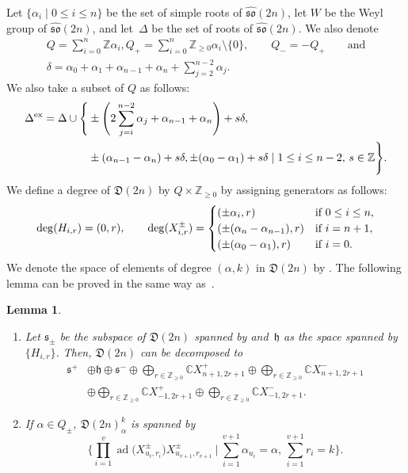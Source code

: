 \documentclass[pdftex]{sigma}
\numberwithin{equation}{section}
\newtheorem{Lemma}[Theorem]{Lemma}
\theoremstyle{definition}
\DeclareMathOperator{\ad}{ad}
\begin{document}
Let $\{\alpha_i\mid0\leq i\leq n\}$ be the set of simple roots of $\widehat{\mathfrak{so}}(2n)$, let $W$ be the Weyl group of $\widehat{\mathfrak{so}}(2n)$, and let~$\Delta$ be the set of roots of $\widehat{\mathfrak{so}}(2n)$. We also denote
\begin{gather*}
Q=\sum_{i=0}^n \mathbb{Z}\alpha_i,Q_+=\sum_{i=0}^n \mathbb{Z}_{\geq0}\alpha_i\setminus\{0\},\qquad Q_-=-Q_+\qquad \text{and}\\ \delta=\alpha_0+\alpha_1+\alpha_{n-1}+\alpha_n+\sum_{j=2}^{n-2} \alpha_j.
\end{gather*} We also take a subset of $Q$ as follows:
\begin{align*}
\Delta^{{\rm ex}}=\Delta\cup\Biggl\{&\pm\Bigg(2\sum_{j=i}^{n-2}\alpha_j+\alpha_{n-1}+\alpha_n\Biggr)+s\delta,\\
&\pm(\alpha_{n-1}-\alpha_n)+s\delta,\pm(\alpha_0-\alpha_1)+s\delta\mid 1\leq i\leq n-2,\,s\in\mathbb{Z}\Biggr\}.
\end{align*}
We define a degree of $\mathfrak{D}(2n)$ by $Q\times\mathbb{Z}_{\geq0}$ by assigning generators as follows:
\begin{gather*}
{\rm deg}(H_{i,r})=(0,r),\qquad {\rm deg}(X^\pm_{i,r})=\begin{cases}
(\pm\alpha_i,r)&\text{if }0\leq i\leq n,\\
(\pm(\alpha_{n}-\alpha_{n-1}),r)&\text{if }i=n+1,\\
(\pm(\alpha_{0}-\alpha_1),r)&\text{if }i=0.
\end{cases}
\end{gather*}
We denote the space of elements of degree $(\alpha,k)$ in $\mathfrak{D}(2n)$ by . The following lemma can be proved in the same way as~\cite[Lemma 3.1]{MRY}.
\begin{Lemma}\label{Lem128}\qquad
\begin{enumerate}\itemsep=0pt
\item[$(1)$] Let $\mathfrak{s}_\pm$ be the subspace of $\mathfrak{D}(2n)$ spanned by \smash{$\bigl\{\prod_{i=1}^v\ad\bigl(X^\pm_{u_i,r_i}\bigr)X^\pm_{u_{v+1},r_{v+1}}\bigr\}$}
and~$\mathfrak{h}$ as the space spanned by $\{H_{i,r}\}$. Then, $\mathfrak{D}(2n)$ can be decomposed to
\begin{align*}
\mathfrak{s}^+& \oplus\mathfrak{h}\oplus\mathfrak{s}^-\oplus \bigoplus_{r\in\mathbb{Z}_{\geq0}}\mathbb{C}X^+_{n+1,2r+1}\oplus \bigoplus_{r\in\mathbb{Z}_{\geq0}}\mathbb{C}X^-_{n+1,2r+1}\\
& \oplus \bigoplus_{r\in\mathbb{Z}_{\geq0}}\mathbb{C}X^+_{-1,2r+1}\oplus \bigoplus_{r\in\mathbb{Z}_{\geq0}}\mathbb{C}X^-_{-1,2r+1}.
\end{align*}
\item[$(2)$] If $\alpha\in Q_{\pm}$, $\mathfrak{D}(2n)_\alpha^k$ is spanned by
\begin{equation*}
\Biggl\{\prod_{i=1}^v\ad\bigl(X^\pm_{u_i,r_i}\bigr)X^\pm_{u_{v+1},r_{v+1}}\:\bigg|\: \sum_{i=1}^{v+1}\alpha_{u_i}=\alpha,\,\sum_{i=1}^{v+1}r_i=k\Biggr\}.
\end{equation*}
\end{enumerate}
\end{Lemma}
\end{document}

